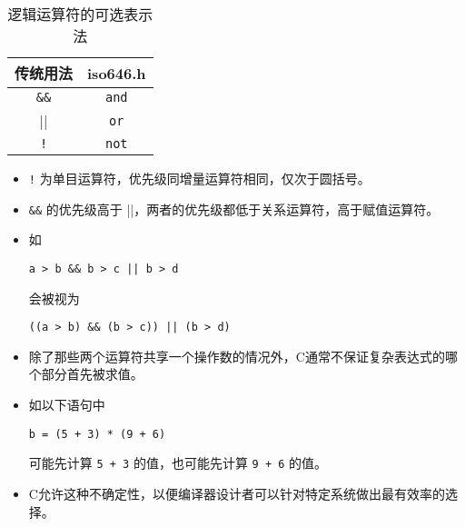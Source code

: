 \begin{frame}[fragile]
\begin{table}
\centering
\caption{逻辑运算符的可选表示法}
\begin{tabular}{c|c}\hline\hline
传统用法 & iso646.h  \\\hline
\lstinline|&&| & \lstinline|and|  \\[0.1in]
\lstinline|||| & \lstinline|or|  \\[0.1in]
\lstinline|!| &  \lstinline|not|  \\\hline\hline
\end{tabular}
\end{table}
\end{frame}


\begin{frame}[fragile]
\begin{itemize}
\item 
\lstinline|!| 为单目运算符，优先级同增量运算符相同，仅次于圆括号。\\[0.2in]
\item
\lstinline|&&| 的优先级高于 \lstinline||||，两者的优先级都低于关系运算符，高于赋值运算符。\\[0.2in]
\item[] 如
\begin{lstlisting}
a > b && b > c || b > d
\end{lstlisting}
会被视为
\begin{lstlisting}
((a > b) && (b > c)) || (b > d)
\end{lstlisting}
\end{itemize}
\end{frame}

\begin{frame}[fragile]
\begin{itemize}
\item 除了那些两个运算符共享一个操作数的情况外，C通常不保证复杂表达式的哪个部分首先被求值。\\[0.2in]
\item [] 
如以下语句中
\begin{lstlisting}
b = (5 + 3) * (9 + 6)
\end{lstlisting}
可能先计算 \lstinline|5 + 3| 的值，也可能先计算 \lstinline|9 + 6| 的值。\\[0.2in]
\item 
C允许这种不确定性，以便编译器设计者可以针对特定系统做出最有效率的选择。
\end{itemize}

\end{frame}


